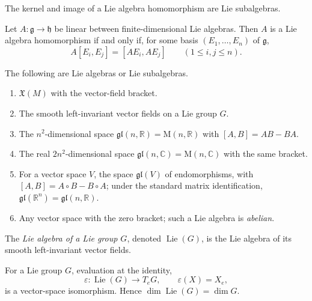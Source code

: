 \begin{proposition}
\label{exer:8-34}
\mathlibok
{}
The kernel and image of a Lie algebra homomorphism are Lie subalgebras.
\end{proposition}

\begin{proposition}
\label{exer:8-35}
\leanok
{}
Let $A\colon\mathfrak g\to\mathfrak h$ be linear between finite-dimensional
Lie algebras. Then $A$ is a Lie algebra homomorphism if and only if, for
some basis $(E_1,\ldots,E_n)$ of $\mathfrak g$,
\[
A[E_i,E_j]=[AE_i,AE_j]
\qquad(1\leq i,j\leq n).
\]
\end{proposition}

\begin{example}
\label{ex:8-36}
\leanok
{}
The following are Lie algebras or Lie subalgebras.
\begin{enumerate}
\item $\mathfrak{X}(M)$ with the vector-field bracket.
\item The smooth left-invariant vector fields on a Lie group $G$.
\item The $n^2$-dimensional space
$\mathfrak{gl}(n,\mathbb{R})=\mathrm{M}(n,\mathbb{R})$ with
$[A,B]=AB-BA$.
\item The real $2n^2$-dimensional space
$\mathfrak{gl}(n,\mathbb{C})=\mathrm{M}(n,\mathbb{C})$ with the same bracket.
\item For a vector space $V$, the space $\mathfrak{gl}(V)$ of endomorphisms,
with $[A,B]=A\circ B-B\circ A$; under the standard matrix identification,
$\mathfrak{gl}(\mathbb R^n)=\mathfrak{gl}(n,\mathbb R)$.
\item Any vector space with the zero bracket; such a Lie algebra is
\emph{abelian}.
\end{enumerate}
\end{example}

\begin{definition}
\label{def:8-60-extra-5}
\mathlibok
The \emph{Lie algebra of a Lie group $G$}, denoted $\operatorname{Lie}(G)$,
is the Lie algebra of its smooth left-invariant vector fields.
\end{definition}

\begin{theorem}
\label{thm:8-37}
\leanok
{}
For a Lie group $G$, evaluation at the identity,
\[
\varepsilon\colon\operatorname{Lie}(G)\longrightarrow T_eG,
\qquad \varepsilon(X)=X_e,
\]
is a vector-space isomorphism. Hence
$\dim\operatorname{Lie}(G)=\dim G$.
\end{theorem}

